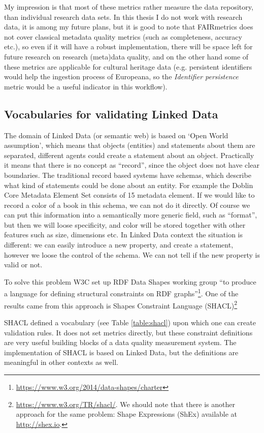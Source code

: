 My impression is that most of these metrics rather measure the data repository, than individual research data sets. In this thesis I do not work with research data, it is among my future plans, but it is good to note that FAIRmetrics does not cover classical metadata quality metrics (such as completeness, accuracy etc.), so even if it will have a robust implementation, there will be space left for future research on research (meta)data quality, and on the other hand some of these metrics are applicable for cultural heritage data (e.g. persistent identifiers would help the ingestion process of Europeana, so the \emph{Identifier persistence} metric would be a useful indicator in this workflow).

\subsection{Vocabularies for validating Linked Data}

The domain of Linked Data (or semantic web) is based on `Open World assumption', which means that objects (entities) and statements about them are separated, different agents could create a statement about an object. Practically it means that there is no concept as ``record'', since the object does not have clear boundaries. The traditional record based systems have schemas, which describe what kind of statements could be done about an entity. For example the Doblin Core Metadata Element Set consists of 15 metadata element. If we would like to record a color of a book in this schema, we can not do it directly. Of course we can put this information into a semantically more generic field, such as ``format'', but then we will loose specificity, and color will be stored together with other features such as size, dimensions etc. In Linked Data context the situation is different: we can easily introduce a new property, and create a statement, however we loose the control of the schema. We can not tell if the new property is valid or not.

To solve this problem W3C set up RDF Data Shapes working group ``to produce a language for defining structural constraints on RDF graphs''\footnote{\url{https://www.w3.org/2014/data-shapes/charter}}. One of the results came from this approach is Shapes Constraint Language (SHACL)\footnote{\url{https://www.w3.org/TR/shacl/}. We should note that there is another approach for the same problem: Shape Expressions (ShEx) available at \url{http://shex.io}.}

SHACL defined a vocabulary (see Table \ref{table:shacl}) upon which one can create validation rules. It does not set metrics directly, but these constraint definitions are very useful building blocks of a data quality measurement system. The implementation of SHACL is based on Linked Data, but the definitions are meaningful in other contexts as well.

